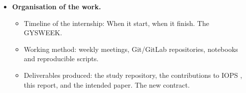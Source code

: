 \begin{itemize}
    \item \textbf{Organisation of the work.}
    \begin{itemize}
        \item Timeline of the internship: When it start, when it finish. The GYSWEEK.
        \item Working method: weekly meetings, Git/GitLab repositories,
              notebooks and reproducible scripts.
        \item Deliverables produced: the study repository, the contributions to IOPS , this report, and the intended paper. The new contract.
    \end{itemize}

\end{itemize}

